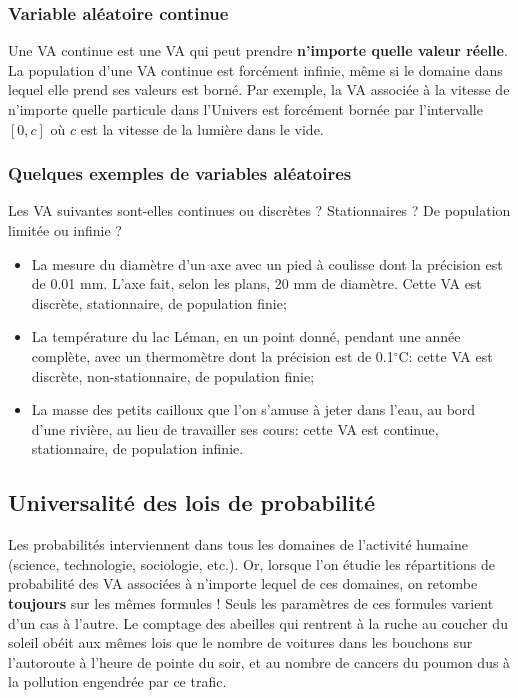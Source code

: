 \documentclass[main.tex]{subfiles}
\begin{document}
\subsubsection{Variable aléatoire continue}

Une VA continue est une VA qui peut prendre \textbf{n'importe quelle valeur réelle}. La population d'une VA continue est forcément infinie, même si le domaine dans lequel elle prend ses valeurs est borné. Par exemple, la VA associée à la vitesse de n'importe quelle particule dans l'Univers est forcément bornée par l'intervalle $[0,c]$ où $c$ est la vitesse de la lumière dans le vide.

\subsubsection*{Quelques exemples de variables aléatoires}

Les VA suivantes sont-elles continues ou discrètes ? Stationnaires ? De population limitée ou infinie ?
\begin{itemize}
    \item La mesure du diamètre d'un axe avec un pied à coulisse dont la précision est de 0.01 mm. L'axe fait, selon les plans, 20 mm de diamètre. Cette VA est discrète, stationnaire, de population finie;
    \item La température du lac Léman, en un point donné, pendant une année complète, avec un thermomètre dont la précision est de 0.1$^\circ$C: cette VA est discrète, non-stationnaire, de population finie;
    \item La masse des petits cailloux que l'on s'amuse à jeter dans l'eau, au bord d'une rivière, au lieu de travailler ses cours: cette VA est continue, stationnaire, de population infinie.
\end{itemize}

\subsection{Universalité des lois de probabilité}

Les probabilités interviennent dans tous les domaines de l'activité humaine (science, technologie, sociologie, etc.). Or, lorsque l'on étudie les répartitions de probabilité des VA associées à n'importe lequel de ces domaines, on retombe \textbf{toujours} sur les mêmes formules ! Seuls les paramètres de ces formules varient d'un cas à l'autre. Le comptage des abeilles qui rentrent à la ruche au coucher du soleil obéit aux mêmes lois que le nombre de voitures dans les bouchons sur l'autoroute à l'heure de pointe du soir, et au nombre de cancers du poumon dus à la pollution engendrée par ce trafic.
\end{document}
